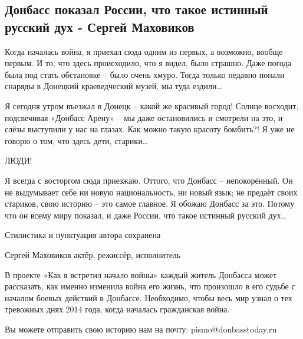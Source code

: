  
 
 

\subsection{Донбасс показал России, что такое истинный русский дух - Сергей Маховиков}

Когда началась война, я приехал сюда одним из первых, а возможно, вообще
первым. И то, что здесь происходило, что я видел, было страшно. Даже погода
была под стать обстановке – было очень хмуро. Тогда только недавно попали
снаряды в Донецкий краеведческий музей, мы туда ездили…

Я сегодня утром въезжал в Донецк – какой же красивый город! Солнце восходит,
подсвечивая «Донбасс Арену» – мы даже остановились и смотрели на это, и слёзы
выступили у нас на глазах. Как можно такую красоту бомбить?! Я уже не говорю о
том, что здесь дети, старики…

ЛЮДИ!

Я всегда с восторгом сюда приезжаю. Оттого, что Донбасс – непокорённый. Он не
выдумывает себе ни новую национальность, ни новый язык; не предаёт своих
стариков, свою историю – это самое главное. Я обожаю Донбасс за это. Потому что
он всему миру показал, и даже России, что такое истинный русский дух…

Стилистика и пунктуация автора сохранена

Сергей Маховиков актёр, режиссёр, исполнитель

В проекте «Как я встретил начало войны» каждый житель Донбасса может
рассказать, как именно изменила война его жизнь, что произошло в его судьбе с
началом боевых действий в Донбассе. Необходимо, чтобы весь мир узнал о тех
тревожных днях 2014 года, когда началась гражданская война.

Вы можете отправить свою историю нам на почту: pismo@donbasstoday.ru
